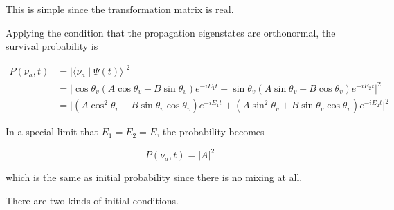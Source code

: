 \documentclass{tufte-handout}
\newcommand{\braket}[2]{\langle #1 \mid #2 \rangle}
\begin{document}
This is simple since the transformation matrix is real.

Applying the condition that the propagation eigenstates are orthonormal, the survival probability is

\begin{align*}
    P(\nu_a,t) & = \lvert \braket{\nu_a}{\Psi(t)}\rvert^2 \\
    & = \lvert \cos\theta_v (A\cos\theta_v -B\sin\theta_v) e^{-iE_1t} + \sin\theta_v(A\sin\theta_v + B \cos\theta_v) e^{-iE_2t} \rvert^2\\
    & =\lvert ( A \cos^2\theta_v - B \sin\theta_v \cos\theta_v ) e^{-iE_1t} + ( A \sin^2\theta_v + B \sin\theta_v \cos\theta_v )e^{-iE_2t} \rvert^2
\end{align*}

In a special limit that $E_1=E_2=E$, the probability becomes

\begin{equation}
    P(\nu_a,t) = \lvert A\rvert^2 
\end{equation}

which is the same as initial probability since there is no mixing at all.

There are two kinds of initial conditions.
\end{document}
